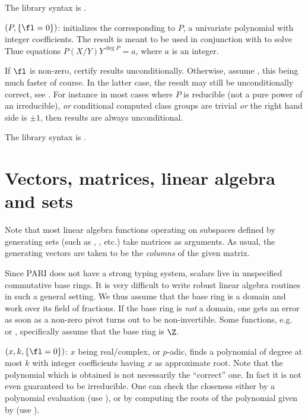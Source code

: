 The library syntax is .

$(P,\{\fl=0\})$: \label{se:thueinit}initializes the  corresponding to $P$, a univariate polynomial
with integer coefficients. The result is meant to be used in conjunction with
 to solve Thue equations $P(X / Y)Y^{\deg P} = a$, where $a$ is an
integer.

If $\fl$ is non-zero, certify results unconditionally. Otherwise, assume
, this being much faster of course. In the latter case, the result
may still be unconditionally correct, see . For instance in most
cases where $P$ is reducible (not a pure power of an irreducible), \emph{or}
conditional computed class groups are trivial \emph{or} the right hand side
is $\pm1$, then results are always unconditional.

The library syntax is .

\section{Vectors, matrices, linear algebra and sets}
\label{se:linear_algebra}

Note that most linear algebra functions operating on subspaces defined by
generating sets (such as , , etc.) take matrices as
arguments. As usual, the generating vectors are taken to be the
\emph{columns} of the given matrix.

Since PARI does not have a strong typing system, scalars live in
unspecified commutative base rings. It is very difficult to write
robust linear algebra routines in such a general setting. We thus
assume that the base ring is a domain and work over its field of
fractions. If the base ring is \emph{not} a domain, one gets an error as soon
as a non-zero pivot turns out to be non-invertible. Some functions,
e.g.~ or , specifically assume that the base ring is
$\Z$.


$(x,k,\{\fl=0\})$: \label{se:algdep}
$x$ being real/complex, or $p$-adic, finds a polynomial of degree at most
$k$ with integer coefficients having $x$ as approximate root. Note that the
polynomial which is obtained is not necessarily the ``correct'' one. In fact
it is not even guaranteed to be irreducible. One can check the closeness
either by a polynomial evaluation (use ), or by computing the
roots of the polynomial given by  (use ).

